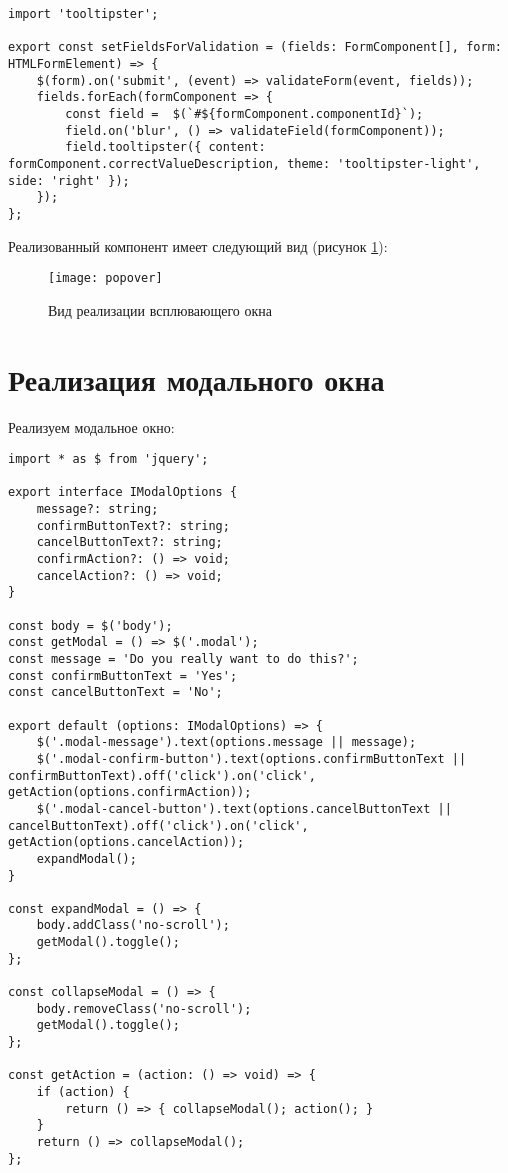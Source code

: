\documentclass[a4paper,14pt]{extarticle}
\begin{document}
\begin{lstlisting}
import 'tooltipster';

export const setFieldsForValidation = (fields: FormComponent[], form: HTMLFormElement) => {
    $(form).on('submit', (event) => validateForm(event, fields));
    fields.forEach(formComponent => {
        const field =  $(`#${formComponent.componentId}`);
        field.on('blur', () => validateField(formComponent));
        field.tooltipster({ content: formComponent.correctValueDescription, theme: 'tooltipster-light', side: 'right' });
    });
};
\end{lstlisting}

Реализованный компонент имеет следующий вид (рисунок \ref{fig:popover}):
\begin{figure}[H]
    \centering
    \texttt{[image: popover]}
    \caption{Вид реализации всплювающего окна}
    \label{fig:popover}
\end{figure}

\section{Реализация модального окна}
Реализуем модальное окно:

\begin{lstlisting}
import * as $ from 'jquery';

export interface IModalOptions {
    message?: string;
    confirmButtonText?: string;
    cancelButtonText?: string;
    confirmAction?: () => void;
    cancelAction?: () => void;
}

const body = $('body');
const getModal = () => $('.modal');
const message = 'Do you really want to do this?';
const confirmButtonText = 'Yes';
const cancelButtonText = 'No';

export default (options: IModalOptions) => {
    $('.modal-message').text(options.message || message);
    $('.modal-confirm-button').text(options.confirmButtonText || confirmButtonText).off('click').on('click', getAction(options.confirmAction));
    $('.modal-cancel-button').text(options.cancelButtonText || cancelButtonText).off('click').on('click', getAction(options.cancelAction));
    expandModal();
}

const expandModal = () => {
    body.addClass('no-scroll');
    getModal().toggle();
};

const collapseModal = () => {
    body.removeClass('no-scroll');
    getModal().toggle();
};

const getAction = (action: () => void) => {
    if (action) {
        return () => { collapseModal(); action(); }
    }
    return () => collapseModal();
};
\end{lstlisting}
\end{document}
